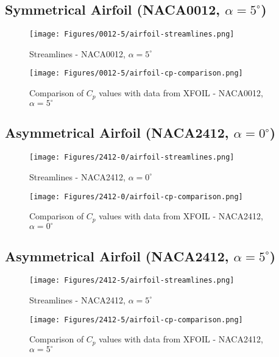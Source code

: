 \subsection{Symmetrical Airfoil (NACA0012, $\alpha=5^{\circ}$)}
\begin{figure}[H]
	\centering
	\texttt{[image: Figures/0012-5/airfoil-streamlines.png]}
	\caption{Streamlines - NACA0012, $\alpha=5^{\circ}$}
	\label{fig:0012-5-airfoil\_streamlines}
\end{figure}
\begin{figure}[H]
	\centering
	\texttt{[image: Figures/0012-5/airfoil-cp-comparison.png]}
	\caption{Comparison of $C_p$ values with data from XFOIL  - NACA0012, $\alpha=5^{\circ}$}
	\label{fig:0012-5-airfoil\_cp\_comparison}
\end{figure}

\subsection{Asymmetrical Airfoil (NACA2412, $\alpha=0^{\circ}$)}
\begin{figure}[H]
	\centering
	\texttt{[image: Figures/2412-0/airfoil-streamlines.png]}
	\caption{Streamlines - NACA2412, $\alpha=0^{\circ}$}
	\label{fig:2412-0-airfoil\_streamlines}
\end{figure}
\begin{figure}[H]
	\centering
	\texttt{[image: Figures/2412-0/airfoil-cp-comparison.png]}
	\caption{Comparison of $C_p$ values with data from XFOIL  - NACA2412, $\alpha=0^{\circ}$}
	\label{fig:2412-0-airfoil\_cp\_comparison}
\end{figure}

\subsection{Asymmetrical Airfoil (NACA2412, $\alpha=5^{\circ}$)}
\begin{figure}[H]
	\centering
	\texttt{[image: Figures/2412-5/airfoil-streamlines.png]}
	\caption{Streamlines - NACA2412, $\alpha=5^{\circ}$}
	\label{fig:2412-5-airfoil\_streamlines}
\end{figure}
\begin{figure}[H]
	\centering
	\texttt{[image: Figures/2412-5/airfoil-cp-comparison.png]}
	\caption{Comparison of $C_p$ values with data from XFOIL  - NACA2412, $\alpha=5^{\circ}$}
	\label{fig:2412-5-airfoil\_cp\_comparison}
\end{figure}

